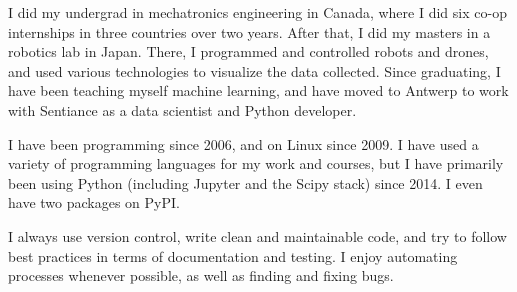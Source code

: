 I did my undergrad in mechatronics engineering in Canada, where I did six co-op internships in three countries over two years.
After that, I did my masters in a robotics lab in Japan.
There, I programmed and controlled robots and drones, and used various technologies to visualize the data collected.
Since graduating, I have been teaching myself machine learning, and have moved to Antwerp to work with Sentiance as a data scientist and Python developer. 

I have been programming since 2006, and on Linux since 2009.
I have used a variety of programming languages for my work and courses, but I have primarily been using Python (including Jupyter and the Scipy stack) since 2014. I even have two packages on PyPI.

I always use version control, write clean and maintainable code, and try to follow best practices in terms of documentation and testing.
I enjoy automating processes whenever possible, as well as finding and fixing bugs.

